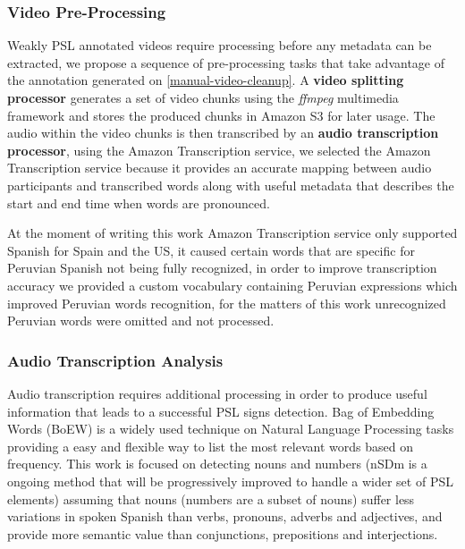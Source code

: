 \documentclass[twocolumn,conference]{article}
\begin{document}
\subsubsection{Video Pre-Processing}\label{video-pre-processing}
Weakly PSL annotated videos require processing before any metadata can be extracted, we propose a sequence of pre-processing tasks that take advantage of the annotation generated on \ref{manual-video-cleanup}. A \textbf{video splitting processor} generates a set of video chunks using the \textit{ffmpeg} multimedia framework and stores the produced chunks in Amazon S3 for later usage. The audio within the video chunks is then transcribed by an \textbf{audio transcription processor}, using the Amazon Transcription service, we selected the Amazon Transcription service because it provides an accurate mapping between audio participants and transcribed words along with useful metadata that describes the start and end time when words are pronounced. 

At the moment of writing this work Amazon Transcription service only supported Spanish for Spain and the US, it caused certain words that are specific for Peruvian Spanish not being fully recognized, in order to improve transcription accuracy we provided a custom vocabulary containing Peruvian expressions which improved  Peruvian words recognition, for the matters of this work unrecognized Peruvian words were omitted and not processed.

\subsubsection{Audio Transcription Analysis}\label{audio-transcription-analysis}
Audio transcription requires additional processing in order to produce useful information that leads to a successful PSL signs detection. Bag of Embedding Words (BoEW) is a widely used technique on Natural Language Processing tasks providing a easy and flexible way to list the most relevant words based on frequency. This work is focused on detecting nouns and numbers (nSDm is a ongoing method that will be progressively improved to handle a wider set of PSL elements) assuming that nouns (numbers are a subset of nouns) suffer less variations in spoken Spanish than verbs, pronouns, adverbs and adjectives, and provide more semantic value than conjunctions, prepositions and interjections. 
\end{document}
